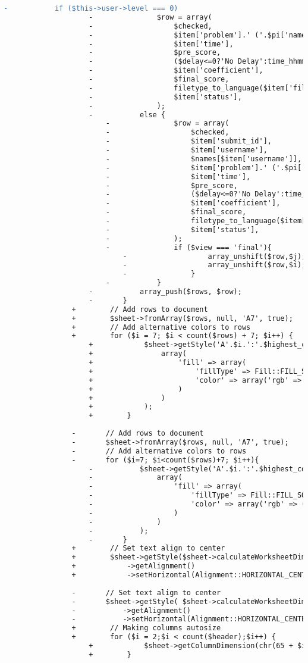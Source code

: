 \begin{lstlisting}[language=diff, caption=Perubahan pada kode Submissions.php]
					-			if ($this->user->level === 0)
					-				$row = array(
					-					$checked,
					-					$item['problem'].' ('.$pi['name'].')',
					-					$item['time'],
					-					$pre_score,
					-					($delay<=0?'No Delay':time_hhmm($delay)),
					-					$item['coefficient'],
					-					$final_score,
					-					filetype_to_language($item['file_type']),
					-					$item['status'],
					-				);
					-			else {
						-				$row = array(
						-					$checked,
						-					$item['submit_id'],
						-					$item['username'],
						-					$names[$item['username']],
						-					$item['problem'].' ('.$pi['name'].')',
						-					$item['time'],
						-					$pre_score,
						-					($delay<=0?'No Delay':time_hhmm($delay)),
						-					$item['coefficient'],
						-					$final_score,
						-					filetype_to_language($item['file_type']),
						-					$item['status'],
						-				);
						-				if ($view === 'final'){
							-					array_unshift($row,$j);
							-					array_unshift($row,$i);
							-				}
						-			}
					-			array_push($rows, $row);
					-		}
				+        // Add rows to document
				+        $sheet->fromArray($rows, null, 'A7', true);
				+        // Add alternative colors to rows
				+        for ($i = 7; $i < count($rows) + 7; $i++) {
					+            $sheet->getStyle('A'.$i.':'.$highest_column.$i)->applyFromArray(
					+                array(
					+                    'fill' => array(
					+                        'fillType' => Fill::FILL_SOLID,
					+                        'color' => array('rgb' => (($i % 2) ? 'F0F0F0' : 'FAFAFA'))
					+                    )
					+                )
					+            );
					+        }
				
				-		// Add rows to document
				-		$sheet->fromArray($rows, null, 'A7', true);
				-		// Add alternative colors to rows
				-		for ($i=7; $i<count($rows)+7; $i++){
					-			$sheet->getStyle('A'.$i.':'.$highest_column.$i)->applyFromArray(
					-				array(
					-					'fill' => array(
					-						'fillType' => Fill::FILL_SOLID,
					-						'color' => array('rgb' => (($i%2)?'F0F0F0':'FAFAFA'))
					-					)
					-				)
					-			);
					-		}
				+        // Set text align to center
				+        $sheet->getStyle($sheet->calculateWorksheetDimension())
				+            ->getAlignment()
				+            ->setHorizontal(Alignment::HORIZONTAL_CENTER);
				
				-		// Set text align to center
				-		$sheet->getStyle( $sheet->calculateWorksheetDimension() )
				-			->getAlignment()
				-			->setHorizontal(Alignment::HORIZONTAL_CENTER);
				+        // Making columns autosize
				+        for ($i = 2;$i < count($header);$i++) {
					+            $sheet->getColumnDimension(chr(65 + $i))->setAutoSize(true);
					+        }
				

\end{lstlisting}

